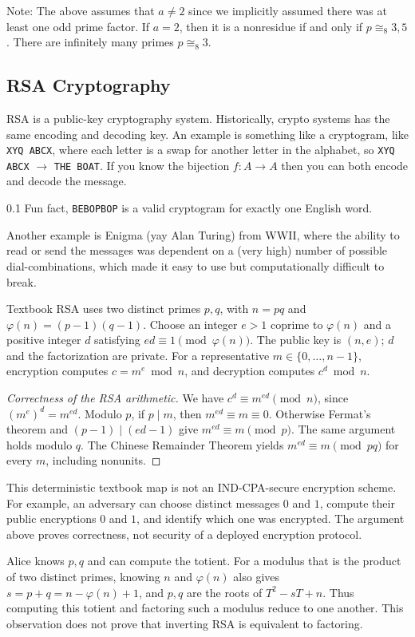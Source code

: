 Note: The above assumes that $a \not= 2$ since we implicitly assumed there was at least one odd prime factor. If $a = 2$, then it is a nonresidue if and only if $p \cong_8 3,5$. There are infinitely many primes $p \cong_8 3$.

\subsection{RSA Cryptography}

RSA is a public-key cryptography system. Historically, crypto systems has the same encoding and decoding key. An example is something like a cryptogram, like \texttt{XYQ ABCX}, where each letter is a swap for another letter in the alphabet, so \texttt{XYQ ABCX} $\to$ \texttt{THE BOAT}. If you know the bijection $f\colon A \to A$ then you can both encode and decode the message.

0.1\textwidth
Fun fact, \texttt{BEBOPBOP} is a valid cryptogram for exactly one English word.

Another example is Enigma (yay Alan Turing) from WWII, where the ability to read or send the messages was dependent on a (very high) number of possible dial-combinations, which made it easy to use but computationally difficult to break.

Textbook RSA uses two distinct primes $p,q$, with $n=pq$ and
$\varphi(n)=(p-1)(q-1)$. Choose an integer $e>1$ coprime to $\varphi(n)$ and a
positive integer $d$ satisfying $ed\equiv1\pmod{\varphi(n)}$.
The public key is $(n,e)$; $d$ and the factorization are private.
For a representative $m\in\{0,\ldots,n-1\}$, encryption computes
$c=m^e\bmod n$, and decryption computes $c^d\bmod n$.
\begin{proof}[Correctness of the RSA arithmetic]
We have $c^d\equiv m^{ed}\pmod n$, since $(m^e)^d=m^{ed}$.
Modulo $p$, if $p\mid m$, then $m^{ed}\equiv m\equiv0$.
Otherwise Fermat's theorem and $(p-1)\mid(ed-1)$ give $m^{ed}\equiv m\pmod p$.
The same argument holds modulo $q$. The Chinese Remainder Theorem yields
$m^{ed}\equiv m\pmod{pq}$ for every $m$, including nonunits.
\end{proof}
\begin{remark}
This deterministic textbook map is not an IND-CPA-secure encryption scheme.
For example, an adversary can choose distinct messages $0$ and $1$, compute
their public encryptions $0$ and $1$, and identify which one was encrypted.
The argument above proves correctness, not security of a deployed encryption protocol.
\end{remark}
\begin{remark}
Alice knows $p,q$ and can compute the totient. For a modulus that is the product
of two distinct primes, knowing $n$ and $\varphi(n)$ also gives
$s=p+q=n-\varphi(n)+1$, and $p,q$ are the roots of $T^2-sT+n$.
Thus computing this totient and factoring such a modulus reduce to one another.
This observation does not prove that inverting RSA is equivalent to factoring.
\end{remark}

